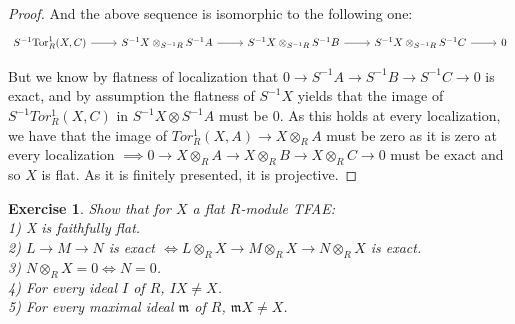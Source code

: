 \documentclass{article}
\newcommand{\fk}[1]{\mathfrak{#1}}
\newtheorem{exercise}{Exercise}
\begin{document}
\begin{proof}
And the above sequence is isomorphic to the following one:
\[
      \begin{tikzcd}
    S^{-1}\text{Tor}_{R}^{1}(X,C) \arrow[r] & S^{-1}X \otimes_{S^{-1}R} S^{-1}A \arrow[r] & S^{-1}X \otimes_{S^{-1}R} S^{-1}B \arrow[r] & S^{-1}X \otimes_{S^{-1}R} S^{-1}C \arrow[r] & 0   
  \end{tikzcd}
\]

But we know by flatness of localization that $0 \to S^{-1}A \to S^{-1}B \to S^{-1}C \to 0$ is exact, and by assumption the flatness of $S^{-1}X$ yields that the image of $S^{-1}Tor_{R}^{1}(X,C)$ in $S^{-1}X \otimes S^{-1}A$ must be $0$. As this holds at every localization, we have that the image of $Tor_{R}^{1}(X,A) \to X \otimes_{R} A$ must be zero as it is zero at every localization $\implies 0 \to X \otimes_{R} A \to X \otimes_{R} B \to X \otimes_{R} C \to 0$ must be exact and so $X$ is flat. As it is finitely presented, it is projective.  
\end{proof}

\begin{exercise}
  Show that for $X$ a flat $R$-module TFAE: \\
  1) X is faithfully flat. \\
  2) $L \to M \to N$ is exact $\iff L \otimes_{R} X \to M \otimes_{R} X \to N \otimes_{R}X$ is exact. \\
  3) $N \otimes_{R} X = 0 \iff N = 0$. \\
  4) For every ideal $I$ of $R$, $IX \neq X$. \\
  5) For every maximal ideal $\fk{m}$ of $R$, $\fk{m}X \neq X$.
\end{exercise}
\end{document}

